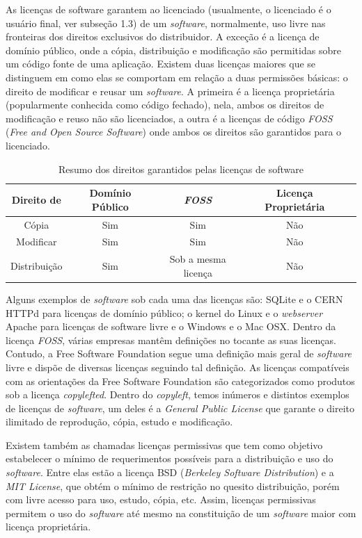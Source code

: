 \documentclass{classe_cn}                 %
\begin{document}
As licenças de software garantem ao licenciado (usualmente, o licenciado é o usuário final, ver subseção 1.3) de um \textit{software}, normalmente, uso livre nas fronteiras dos direitos exclusivos do distribuidor. A exceção é a licença de domínio público, onde a cópia, distribuição e modificação são permitidas sobre um código fonte de uma aplicação.
Existem duas licenças maiores que se distinguem em como elas se comportam em relação a duas permissões básicas: o direito de modificar e reusar um \textit{software}. A primeira é a licença proprietária (popularmente conhecida como código fechado), nela, ambos os direitos de modificação e reuso não são licenciados, a outra é a licenças de código \textit{FOSS} (\textit{Free and Open Source Software}) onde ambos os direitos são garantidos para o licenciado.

\begin{table}[h!]
\label{tag_tabela_2}
\caption{Resumo dos direitos garantidos pelas licenças de software}
	\begin{tabular}{ccccc}
	\hline
	Direito de		&	Domínio Público	&	\textit{FOSS}	&	Licença Proprietária \\ \hline
	Cópia	&	Sim	&	Sim	&	Não							\\
	Modificar	&	Sim	&	Sim	&	Não						\\
	Distribuição	&	Sim	&	Sob a mesma licença	&	Não\\ \hline
	\end{tabular}
	\end{table}
	
Alguns exemplos de \textit{software} sob cada uma das licenças são: SQLite e o CERN HTTPd para licenças de domínio público; o kernel do Linux e o \textit{webserver} Apache para licenças de software livre e o Windows e o Mac OSX.
Dentro da licença \textit{FOSS}, várias empresas mantêm definições no tocante as suas licenças. Contudo, a Free Software Foundation segue uma definição mais geral de \textit{software} livre e dispõe de diversas licenças seguindo tal definição. As licenças compatíveis com as orientações da Free Software Foundation são categorizados como produtos sob a licença \textit{copylefted}. Dentro do \textit{copyleft}, temos inúmeros e distintos exemplos de licenças de \textit{software}, um deles é a \textit{General Public License} que garante o direito ilimitado de reprodução, cópia, estudo e modificação. 

Existem também as chamadas licenças permissivas que tem como objetivo estabelecer o mínimo de requerimentos possíveis para a distribuição e uso do \textit{software}. Entre elas estão a licença BSD (\textit{Berkeley Software Distribution}) e a \textit{MIT License}, que obtém o mínimo de restrição no quesito distribuição, porém com livre acesso para uso, estudo, cópia, etc. Assim, licenças permissivas permitem o uso do \textit{software} até mesmo na constituição de um \textit{software} maior com licença proprietária.
\end{document}
